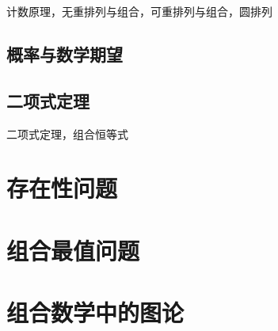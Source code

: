 \documentclass[lang=cn, zihao=5]{elegantbook}
\begin{document}
计数原理，无重排列与组合，可重排列与组合，圆排列

\section{概率与数学期望}

\section{二项式定理}

二项式定理，组合恒等式

\chapter{存在性问题}

\chapter{组合最值问题}

\chapter{组合数学中的图论}
\end{document}
